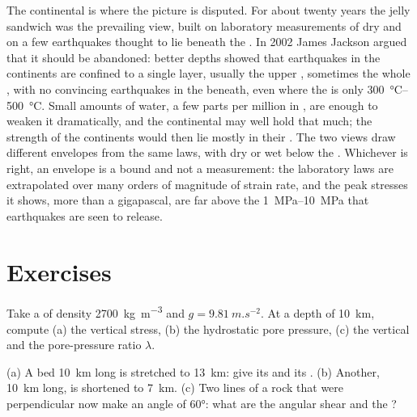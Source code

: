 The continental  is where the picture is disputed. For about twenty
years the jelly sandwich was the prevailing view, built on laboratory
measurements of dry  and on a few earthquakes thought to lie beneath
the . In 2002 James Jackson argued that it should be abandoned: better
depths showed that earthquakes in the continents are confined to a single
layer, usually the upper , sometimes the whole , with no convincing
earthquakes in the  beneath, even where the  is only
\qtyrange{300}{500}{\degreeCelsius}. Small amounts of water, a few parts per
million in , are enough to weaken it dramatically, and the continental
 may well hold that much; the strength of the continents would then lie
mostly in their . The two views draw different envelopes from the same
laws, with dry or wet  below the .
Whichever is right, an envelope is a bound and not a measurement: the
laboratory laws are extrapolated over many orders of magnitude of strain rate,
and the peak stresses it shows, more than a gigapascal, are far above the
\qtyrange{1}{10}{MPa} that earthquakes are seen to release.

\section{Exercises}

\begin{exercise}[$\star$]\label{exo:b1:stress-strain-rheology:1}
Take a  of density \qty{2700}{kg.m^{-3}} and $g = \qty{9.81}{m.s^{-2}}$.
At a depth of \qty{10}{km}, compute (a) the vertical stress, (b) the
hydrostatic pore pressure, (c) the vertical  and the
pore-pressure ratio $\lambda$.
\end{exercise}

\begin{exercise}[$\star$]\label{exo:b1:stress-strain-rheology:2}
(a) A bed \qty{10}{km} long is stretched to \qty{13}{km}: give its 
and its . (b) Another, \qty{10}{km} long, is shortened to \qty{7}{km}.
(c) Two lines of a rock that were perpendicular now make an angle of
\ang{60}: what are the angular shear and the ?
\end{exercise}

